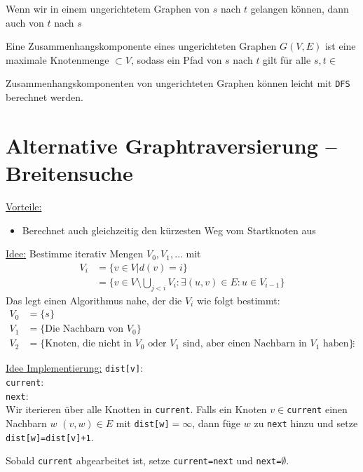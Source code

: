 \documentclass[11pt]{scrbook}
\begin{document}
\begin{note}
Wenn wir in einem ungerichtetem Graphen von $s$ nach $t$ gelangen können, dann auch von $t$ nach $s$
\end{note}

\begin{df}
Eine Zusammenhangskomponente  eines ungerichteten Graphen $G(V,E)$ ist eine maximale Knotenmenge $\subset V$, sodass
ein Pfad von $s$ nach $t$ gilt für alle $s,t\in$
\begin{note}
Zusammenhangskomponenten von ungerichteten Graphen können leicht mit \verb|DFS| berechnet werden.
\end{note}
\end{df}

\section{Alternative Graphtraversierung – Breitensuche}

\underline{Vorteile:}
\begin{itemize}
\item Berechnet auch gleichzeitig den kürzesten Weg vom Startknoten aus
\end{itemize}
\underline{Idee:}
Bestimme iterativ Mengen $V_0,V_1,\dotsc$ mit
\begin{align*}
V_i&=\{v\in V|d(v)=i\}\\
&=\{v\in V\setminus \bigcup_{j<i}V_i : \exists (u,v)\in E : u\in V_{i-1}\}
\end{align*}
Das legt einen Algorithmus nahe, der die $V_i$ wie folgt bestimmt:
\begin{align*}
V_0&=\{s\}\\
V_1 &= \{\text{Die Nachbarn von $V_0$}\}\\
V_2 &= \{\text{Knoten, die nicht in $V_0$ oder $V_1$ sind, aber einen Nachbarn in $V_1$ haben}\}
&\vdots 
\end{align*}

\underline{Idee Implementierung:}
\verb|dist[v]|:\\
\verb|current|:\\
\verb|next|:\\

Wir iterieren über alle Knotten in \verb|current|.
Falls ein Knoten $v\in$\verb|current| einen Nachbarn $w$ $(v,w) \in E$ mit 
\verb|dist[w]|$=\infty$, dann füge $w$ zu \verb|next| hinzu und setze \verb|dist[w]=dist[v]+1|.

Sobald \verb|current| abgearbeitet ist, setze \verb|current=next| und \verb|next=|$\emptyset$.
\end{document}
